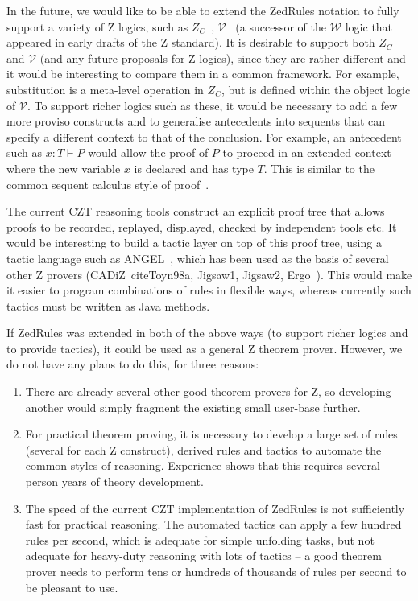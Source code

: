 \documentclass{entcs}
\newcommand{\V}{\mathcal{V}}
\newcommand{\Zc}{Z_C}
\begin{document}
In the future, we would like to be able to extend the ZedRules notation to
fully support a variety of Z logics, such as
$\Zc$~\cite{henson:revising-z-1-99,henson:revising-z-2-99},
$\V$~\cite{brien:calculus-schemas-z00} (a successor of the
$\mathcal{W}$ logic that appeared in early drafts of the Z standard).  It
is desirable to support both $\Zc$ and $\V$ (and any future
proposals for Z logics), since they are rather different and it would be
interesting to compare them in a common framework.  For example,
substitution is a meta-level operation in $\Zc$, but is defined within the
object logic of $\V$.  To support richer logics such as these,
it would be necessary to add a few more proviso constructs and to
generalise antecedents into sequents that can specify a different context
to that of the conclusion.  For example, an antecedent such as $x:T \vdash
P$ would allow the proof of $P$ to proceed in an extended context where the
new variable $x$ is declared and has type $T$.  This is 
similar to the common sequent calculus style of
proof~\cite{girard:proofs-types90}. 

The current CZT reasoning tools construct an explicit proof tree that
allows proofs to be recorded, replayed, displayed, checked by independent
tools etc.
It would be interesting to build a tactic layer on top of this proof
tree, using a tactic language such as ANGEL~\cite{martin:tactics}, which
has been used as the basis of several other Z provers
(CADiZ~cite{Toyn98a}, Jigsaw1, Jigsaw2,
Ergo~\cite{martin:tac-lang-for-ergo}).
This would make it easier to program combinations of rules 
in flexible ways, whereas currently such tactics must be written as
Java methods.

If ZedRules was extended in both of the above ways (to support richer
logics and to provide tactics), it could be used as a general Z theorem
prover.  However, we do not have any plans to do this, for three reasons:
\begin{enumerate}
\item There are already several other good theorem provers for Z, so
  developing another would simply fragment the existing small user-base
  further.
\item For practical theorem proving, it is necessary to develop a large set
  of rules (several for each Z construct), derived rules and tactics to
  automate the common styles of reasoning.  Experience shows that this
  requires several person years of theory development. 
\item The speed of the current CZT implementation of ZedRules is not
  sufficiently fast for practical reasoning.  The automated tactics can
  apply a few hundred rules per second, which is adequate for simple unfolding
  tasks, but not adequate for heavy-duty reasoning with lots of tactics --
  a good theorem prover needs to perform tens or hundreds of thousands of
  rules per second to be pleasant to use.
\end{enumerate}
\end{document}
